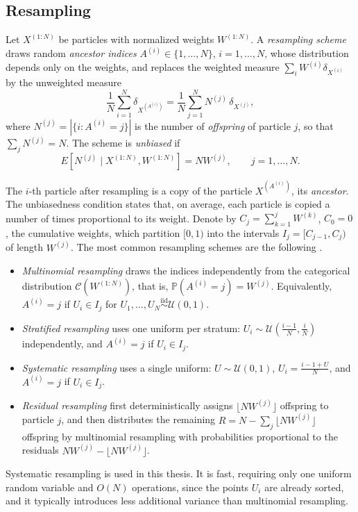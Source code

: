 \subsection{Resampling}
\label{sec:resampling}
\begin{definition}
    \label{def:resampling}
    Let $X^{(1:N)}$ be particles with normalized weights $W^{(1:N)}$. A \emph{resampling scheme} draws random \emph{ancestor indices} $A^{(i)}\in\{1,\ldots,N\}$, $i=1,\ldots,N$, whose distribution depends only on the weights, and replaces the weighted measure $\sum_{i}W^{(i)}\delta_{X^{(i)}}$ by the unweighted measure
    \begin{equation}
        \frac{1}{N}\sum_{i=1}^{N}\delta_{X^{(A^{(i)})}} = \frac{1}{N}\sum_{j=1}^{N}N^{(j)}\,\delta_{X^{(j)}},
        \label{eq:resampled_measure}
    \end{equation}
    where $N^{(j)} = |\{i : A^{(i)} = j\}|$ is the number of \emph{offspring} of particle $j$, so that $\sum_jN^{(j)} = N$. The scheme is \emph{unbiased} if
    \begin{equation}
        E\left[N^{(j)}\mid X^{(1:N)},W^{(1:N)}\right] = NW^{(j)}, \qquad j=1,\ldots,N.
        \label{eq:unbiased_resampling}
    \end{equation}
\end{definition}

The $i$-th particle after resampling is a copy of the particle $X^{(A^{(i)})}$, its \emph{ancestor}. The unbiasedness condition states that, on average, each particle is copied a number of times proportional to its weight. Denote by $C_j = \sum_{k=1}^{j}W^{(k)}$, $C_0 = 0$, the cumulative weights, which partition $[0,1)$ into the intervals $I_j = [C_{j-1},C_j)$ of length $W^{(j)}$. The most common resampling schemes are the following \cite{chopin2020smc}.
\begin{itemize}
    \item \emph{Multinomial resampling} draws the indices independently from the categorical distribution $\mathcal{C}(W^{(1:N)})$, that is, $\mathbb{P}(A^{(i)} = j) = W^{(j)}$. Equivalently, $A^{(i)} = j$ if $U_i\in I_j$ for $U_1,\ldots,U_N\overset{\mathrm{iid}}{\sim}\mathcal{U}(0,1)$.
    \item \emph{Stratified resampling} uses one uniform per stratum: $U_i\sim\mathcal{U}\left(\frac{i-1}{N},\frac{i}{N}\right)$ independently, and $A^{(i)} = j$ if $U_i\in I_j$.
    \item \emph{Systematic resampling} uses a single uniform: $U\sim\mathcal{U}(0,1)$, $U_i = \frac{i-1+U}{N}$, and $A^{(i)} = j$ if $U_i\in I_j$.
    \item \emph{Residual resampling} first deterministically assigns $\lfloor NW^{(j)}\rfloor$ offspring to particle $j$, and then distributes the remaining $R = N-\sum_j\lfloor NW^{(j)}\rfloor$ offspring by multinomial resampling with probabilities proportional to the residuals $NW^{(j)}-\lfloor NW^{(j)}\rfloor$.
\end{itemize}
Systematic resampling is used in this thesis. It is fast, requiring only one uniform random variable and $O(N)$ operations, since the points $U_i$ are already sorted, and it typically introduces less additional variance than multinomial resampling.

